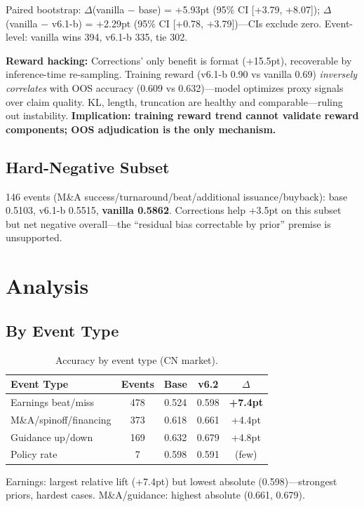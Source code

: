\documentclass[sigconf, anonymous, review]{acmart}
\begin{document}
Paired bootstrap: $\Delta$(vanilla $-$ base) = +5.93pt (95\% CI [+3.79, +8.07]); $\Delta$(vanilla $-$ v6.1-b) = +2.29pt (95\% CI [+0.78, +3.79])---CIs exclude zero. Event-level: vanilla wins 394, v6.1-b 335, tie 302.

\textbf{Reward hacking:} Corrections' only benefit is format (+15.5pt), recoverable by inference-time re-sampling. Training reward (v6.1-b 0.90 vs vanilla 0.69) \emph{inversely correlates} with OOS accuracy (0.609 vs 0.632)---model optimizes proxy signals over claim quality. KL, length, truncation are healthy and comparable---ruling out instability. \textbf{Implication: training reward trend cannot validate reward components; OOS adjudication is the only mechanism.}

\subsection{Hard-Negative Subset}

146 events (M\&A success/turnaround/beat/additional issuance/buyback): base 0.5103, v6.1-b 0.5515, \textbf{vanilla 0.5862}. Corrections help +3.5pt on this subset but net negative overall---the ``residual bias correctable by prior'' premise is unsupported.

\section{Analysis}

\subsection{By Event Type}

\begin{table}[t]
\centering\small
\caption{Accuracy by event type (CN market).}
\label{tab:bytype}
\begin{tabular}{@{}lcccc@{}}
\toprule
Event Type & Events & Base & v6.2 & $\Delta$ \\
\midrule
Earnings beat/miss & 478 & 0.524 & 0.598 & \textbf{+7.4pt} \\
M\&A/spinoff/financing & 373 & 0.618 & 0.661 & +4.4pt \\
Guidance up/down & 169 & 0.632 & 0.679 & +4.8pt \\
Policy rate & 7 & 0.598 & 0.591 & (few) \\
\bottomrule
\end{tabular}
\end{table}

Earnings: largest relative lift (+7.4pt) but lowest absolute (0.598)---strongest priors, hardest cases. M\&A/guidance: highest absolute (0.661, 0.679).
\end{document}
